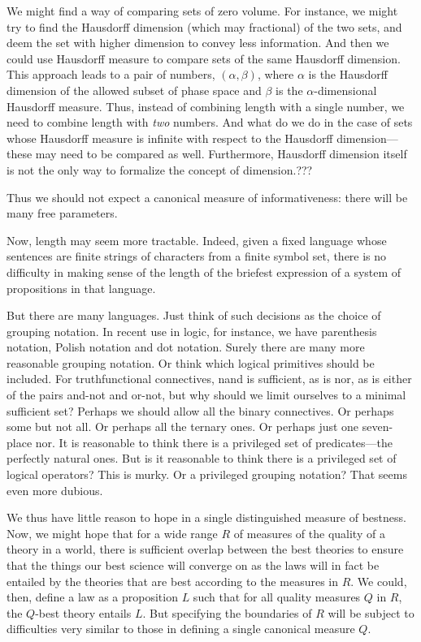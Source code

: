 We might find a way of comparing sets of zero volume. For instance, we might try to find the Hausdorff dimension (which may fractional)
of the two sets, and deem the set with higher dimension to convey less information. And then we could use Hausdorff measure to compare
sets of the same Hausdorff dimension. This approach leads to a pair of numbers, $(\alpha,\beta)$, where $\alpha$ is the Hausdorff dimension of the allowed subset of phase space
and $\beta$ is the $\alpha$-dimensional Hausdorff measure. Thus, instead of combining length with a single number, we need to combine length
with \textit{two} numbers. And what do we do in the case of sets whose Hausdorff measure is infinite with respect to the Hausdorff dimension---these
may need to be compared as well. Furthermore, Hausdorff dimension itself
is not the only way to formalize the concept of dimension.???

Thus we should not expect a canonical measure of informativeness: there will be many free parameters.

Now, length may seem more tractable. Indeed, given a fixed language whose sentences are
finite strings of characters from a finite symbol set, there is no difficulty in making sense of the length of the briefest 
expression of a system of propositions in that language. 

But there are many languages. Just think of such decisions as the choice of grouping notation. In recent
use in logic, for instance, we have parenthesis notation, Polish notation and dot notation. Surely there are many more
reasonable grouping notation. Or think which logical primitives should be included. For truthfunctional connectives,
nand is sufficient, as is nor, as is either of the pairs and-not and or-not, but why should we limit ourselves to a minimal 
sufficient set? Perhaps we should allow all the binary connectives. Or perhaps some but not all. Or perhaps all the ternary
ones. Or perhaps just one seven-place nor. It is reasonable to think there is a privileged set of predicates---the perfectly 
natural ones. But is it reasonable to think there is a privileged set of logical operators? This is murky. Or a privileged
grouping notation? That seems even more dubious.

We thus have little reason to hope in a single distinguished measure of bestness. Now, we might hope that for a wide range $R$ 
of measures of the quality of a theory in a world, there is sufficient overlap between the best theories to ensure that
the things our best science will converge on as the laws will in fact be entailed by the theories that are best according to the 
measures in $R$. We could, then, define a law as a proposition $L$ such that for all quality measures $Q$ in $R$, the $Q$-best theory
entails $L$. But specifying the boundaries of $R$ will be subject to difficulties very similar to those in defining a single canonical 
measure $Q$.

